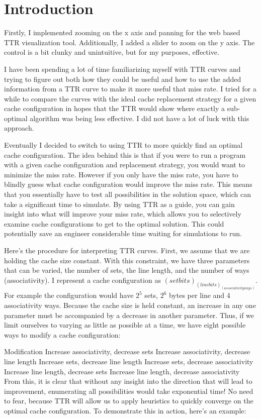 \section{Introduction}
Firstly, I implemented zooming on the x axis and panning for the web based TTR visualization tool. Additionally, I added a slider to zoom on the y axis. The control is a bit clunky and unintuitive, but for my purposes, effective.

I have been spending a lot of time familiarizing myself with TTR curves and trying to figure out both how they could be useful and how to use the added information from a TTR curve to make it more useful that miss rate. I tried for a while to compare the curves with the ideal cache replacement strategy for a given cache configuration in hopes that the TTR would show where exactly a sub-optimal algorithm was being less effective. I did not have a lot of luck with this approach.

Eventually I decided to switch to using TTR to more quickly find an optimal cache configuration. The idea behind this is that if you were to run a program with a given cache configuration and replacement strategy, you would want to minimize the miss rate. However if you only have the miss rate, you have to blindly guess what cache configuration would improve the miss rate. This means that you essentially have to test all possibilities in the solution space, which can take a significant time to simulate. By using TTR as a guide, you can gain insight into what will improve your miss rate, which allows you to selectively examine cache configurations to get to the optimal solution. This could potentially save an engineer considerable time waiting for simulations to run.

Here's the procedure for interpreting TTR curves. First, we assume that we are holding the cache size constant. With this constraint, we have three parameters that can be varied, the number of sets, the line length, and the number of ways (associativity). I represent a cache configuration as $(set bits)_(line bits)_(associativity ways)$. For example the configuration 
would have $2^5$ sets, $2^6$ bytes per line and 4 associativity ways. Because the cache size is held constant, an increase in any one parameter must be accompanied by a decrease in another parameter. Thus, if we limit ourselves to varying as little as possible at a time, we have eight possible ways to modify a cache configuration:

Modification
Increase associativity, decrease sets
Increase associativity, decrease line length
Increase sets, decrease line length
Increase sets, decrease associativity
Increase line length, decrease sets
Increase line length, decrease associativity
From this, it is clear that without any insight into the direction that will lead to improvement, enumerating all possibilities would take exponential time! No need to fear, because TTR will allow us to apply heuristics to quickly converge on the optimal cache configuration. To demonstrate this in action, here's an example:

